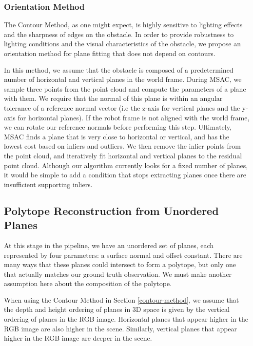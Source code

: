 \subsubsection{Orientation Method} \label{orient-method}

The Contour Method, as one might expect, is highly sensitive to lighting effects and the sharpness of edges on the obstacle. In order to provide robustness to lighting conditions and the visual characteristics of the obstacle, we propose an orientation method for plane fitting that does not depend on contours.

In this method, we assume that the obstacle is composed of a predetermined number of horizontal and vertical planes in the world frame. During MSAC, we sample three points from the point cloud and compute the parameters of a plane with them. We require that the normal of this plane is within an angular tolerance of a reference normal vector (i.e the z-axis for vertical planes and the y-axis for horizontal planes). If the robot frame is not aligned with the world frame, we can rotate our reference normals before performing this step. Ultimately, MSAC finds a plane that is very close to horizontal or vertical, and has the lowest cost based on inliers and outliers. We then remove the inlier points from the point cloud, and iteratively fit horizontal and vertical planes to the residual point cloud. Although our algorithm currently looks for a fixed number of planes, it would be simple to add a condition that stops extracting planes once there are insufficient supporting inliers.

\subsection{Polytope Reconstruction from Unordered Planes} \label{polytope-section}

At this stage in the pipeline, we have an unordered set of planes, each represented by four parameters: a surface normal and offset constant. There are many ways that these planes could intersect to form a polytope, but only one that actually matches our ground truth observation. We must make another assumption here about the composition of the polytope.

When using the Contour Method in Section \ref{contour-method}, we assume that the depth and height ordering of planes in 3D space is given by the vertical ordering of planes in the RGB image. Horizontal planes that appear higher in the RGB image are also higher in the scene. Similarly, vertical planes that appear higher in the RGB image are deeper in the scene.

